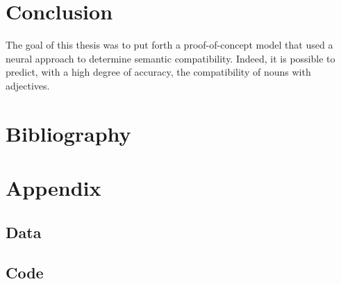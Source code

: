 \documentclass[a4paper, 11pt]{scrartcl}
\begin{document}
\section{Conclusion}
The goal of this thesis was to put forth a proof-of-concept model that used a neural approach to determine semantic compatibility. Indeed, it is possible to predict, with a high degree of accuracy, the compatibility of nouns with adjectives.

\section{Bibliography}


\printbibliography                      %

\section{Appendix}

\subsection{Data}

\subsection{Code}
\end{document}
